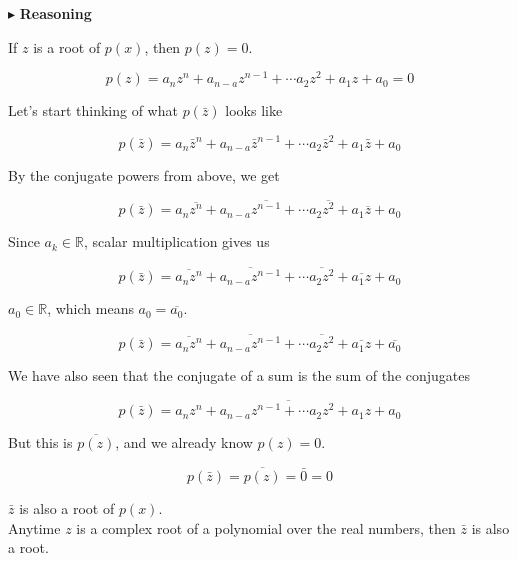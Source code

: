 \documentclass{ximera}
\begin{document}
$\blacktriangleright$ \textbf{Reasoning}




If $z$ is a root of $p(x)$, then $p(z) = 0$.


\[    p(z) = a_n z^n + a_{n-a} z^{n-1} + \cdots a_2 z^2 + a_1 z + a_0  = 0   \]


Let's start thinking of what $p(\bar{z})$ looks like



\[    p(\bar{z}) = a_n \bar{z}^n + a_{n-a} \bar{z}^{n-1} + \cdots a_2 \bar{z}^2 + a_1 \bar{z} + a_0    \]


By the conjugate powers from above, we get 


\[    p(\bar{z}) = a_n \overline{z^n} + a_{n-a} \overline{z^{n-1}} + \cdots a_2 \overline{z^2} + a_1 \overline{z} + a_0    \]



Since $a_k \in \mathbb{R}$, scalar multiplication gives us




\[    p(\bar{z}) = \overline{a_n z^n} +  \overline{a_{n-a} z^{n-1}} + \cdots  \overline{a_2 z^2} +  \overline{a_1 z} + a_0    \]



$a_0 \in \mathbb{R}$, which means $a_0 = \overline{a_0}$.



\[    p(\bar{z}) = \overline{a_n z^n} +  \overline{a_{n-a} z^{n-1}} + \cdots  \overline{a_2 z^2} +  \overline{a_1 z} + \overline{a_0}    \]





We have also seen that the conjugate of a sum is the sum of the conjugates


\[    p(\bar{z}) = \overline{a_n z^n + a_{n-a} z^{n-1} + \cdots  a_2 z^2 +  a_1 z + a_0}   \]



But this is $\overline{p(z)}$, and we already know  $p(z) = 0$.



\[    p(\bar{z}) = \overline{p(z)} = \bar{0} = 0  \]


$\bar{z}$ is also a root of $p(x)$. \\





Anytime $z$ is a complex root of a polynomial over the real numbers, then $\bar{z}$ is also a root. \\\
\end{document}
